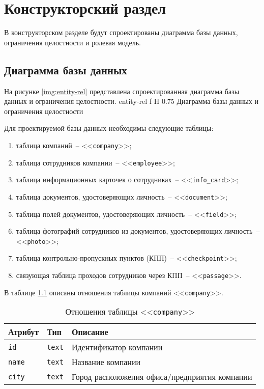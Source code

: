 \chapter{Конструкторский раздел}

В конструкторском разделе будут спроектированы диаграмма базы данных, ограничения целостности и ролевая модель.
	
\section{Диаграмма базы данных}

На рисунке \ref{img:entity-rel} представлена спроектированная диаграмма базы данных и ограничения целостности.
	{entity-rel}
	{f}
	{H}
	{0.75\textwidth}
	{Диаграмма базы данных и ограничения целостности}

Для проектируемой базы данных необходимы следующие таблицы:
\begin{enumerate}
	\item таблица компаний~-- <<\texttt{company}>>;
	\item таблица сотрудников компании~-- <<\texttt{employee}>>;
	\item таблица информационных карточек о сотрудниках~-- <<\texttt{info\_card}>>;
	\item таблица документов, удостоверяющих личность~-- <<\texttt{document}>>;
	\item таблица полей документов, удостоверяющих личность~-- <<\texttt{field}>>;
	\item таблица фотографий сотрудников из документов, удостоверяющих личность~-- <<\texttt{photo}>>;
	\item таблица контрольно-пропускных пунктов (КПП)~-- <<\texttt{checkpoint}>>;
	\item связующая таблица проходов сотрудников через КПП~-- <<\texttt{passage}>>.
\end{enumerate}

В таблице \ref{table:companyCols} описаны отношения таблицы компаний <<\texttt{company}>>.
\begin{table}[h!]
	\begin{center}
		\caption{\label{table:companyCols} Отношения таблицы <<\texttt{company}>>}
		\begin{tabularx}{\textwidth}{|X|X|X|}
			\hline
			Атрибут & Тип & Описание \\ \hline
			\texttt{id} & \texttt{text} & Идентификатор компании \\ \hline
			\texttt{name} & \texttt{text} & Название компании \\ \hline
			\texttt{city} & \texttt{text} & Город расположения офиса/предприятия компании \\ \hline
		\end{tabularx}
	\end{center}
\end{table}

